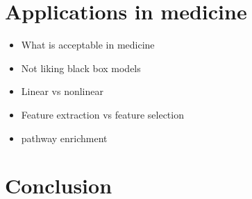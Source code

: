 \documentclass[12pt, wide]{mwart}
\begin{document}
\section{Applications in medicine}

\begin{itemize}
    \item What is acceptable in medicine
    \item Not liking black box models
    \item Linear vs nonlinear
    \item Feature extraction vs feature selection
    \item pathway enrichment
\end{itemize}

\section{Conclusion}



\end{document}

